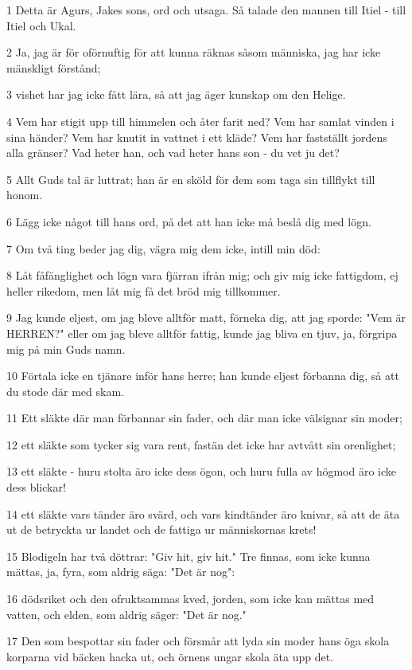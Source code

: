 \par 1 Detta är Agurs, Jakes sons, ord och utsaga. Så talade den mannen till Itiel - till Itiel och Ukal.
\par 2 Ja, jag är för oförnuftig för att kunna räknas såsom människa, jag har icke mänskligt förstånd;
\par 3 vishet har jag icke fått lära, så att jag äger kunskap om den Helige.
\par 4 Vem har stigit upp till himmelen och åter farit ned? Vem har samlat vinden i sina händer? Vem har knutit in vattnet i ett kläde? Vem har fastställt jordens alla gränser? Vad heter han, och vad heter hans son - du vet ju det?
\par 5 Allt Guds tal är luttrat; han är en sköld för dem som taga sin tillflykt till honom.
\par 6 Lägg icke något till hans ord, på det att han icke må beslå dig med lögn.
\par 7 Om två ting beder jag dig, vägra mig dem icke, intill min död:
\par 8 Låt fåfänglighet och lögn vara fjärran ifrån mig; och giv mig icke fattigdom, ej heller rikedom, men låt mig få det bröd mig tillkommer.
\par 9 Jag kunde eljest, om jag bleve alltför matt, förneka dig, att jag sporde: "Vem är HERREN?" eller om jag bleve alltför fattig, kunde jag bliva en tjuv, ja, förgripa mig på min Guds namn.
\par 10 Förtala icke en tjänare inför hans herre; han kunde eljest förbanna dig, så att du stode där med skam.
\par 11 Ett släkte där man förbannar sin fader, och där man icke välsignar sin moder;
\par 12 ett släkte som tycker sig vara rent, fastän det icke har avtvått sin orenlighet;
\par 13 ett släkte - huru stolta äro icke dess ögon, och huru fulla av högmod äro icke dess blickar!
\par 14 ett släkte vars tänder äro svärd, och vars kindtänder äro knivar, så att de äta ut de betryckta ur landet och de fattiga ur människornas krets!
\par 15 Blodigeln har två döttrar: "Giv hit, giv hit." Tre finnas, som icke kunna mättas, ja, fyra, som aldrig säga: "Det är nog":
\par 16 dödsriket och den ofruktsammas kved, jorden, som icke kan mättas med vatten, och elden, som aldrig säger: "Det är nog."
\par 17 Den som bespottar sin fader och försmår att lyda sin moder hans öga skola korparna vid bäcken hacka ut, och örnens ungar skola äta upp det.
